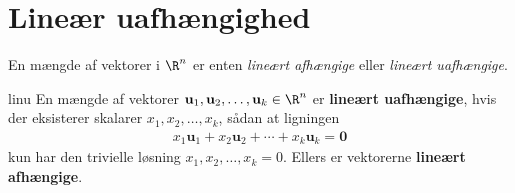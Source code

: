 \section{Lineær uafhængighed}
En mængde af vektorer i $\R^n$ er enten \textit{lineært afhængige} eller \textit{lineært uafhængige}.
%
%
% 
\begin{defn}{}{linu}
En mængde af vektorer $\mathbf{u}_1, \mathbf{u}_2, \ldots , \mathbf{u}_k \in \R^n$ er \textbf{lineært uafhængige}, hvis der eksisterer skalarer $x_1, x_2, \ldots , x_k$, sådan at ligningen 
\begin{align*}
x_1\mathbf{u}_1 + x_2\mathbf{u}_2 + \cdots + x_k \mathbf{u}_k = \mathbf{0}
\end{align*}
kun har den trivielle løsning $x_1, x_2, \ldots, x_k = 0$.
Ellers er vektorerne \textbf{lineært afhængige}.
\end{defn}  
%
